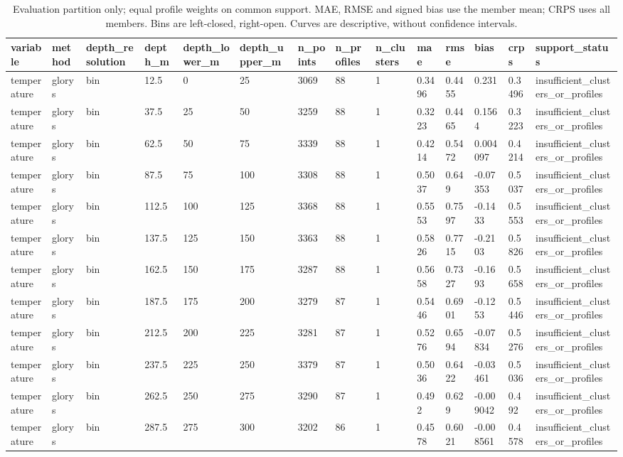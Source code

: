 \begin{table}[htbp]
\centering
\caption{Evaluation partition only; equal profile weights on common support. MAE, RMSE and signed bias use the member mean; CRPS uses all members. Bins are left-closed, right-open. Curves are descriptive, without confidence intervals.}
\begin{tabular}{llllllllllllll}
\toprule
variable & method & depth\_resolution & depth\_m & depth\_lower\_m & depth\_upper\_m & n\_points & n\_profiles & n\_clusters & mae & rmse & bias & crps & support\_status \\
\midrule
temperature & glorys & bin & 12.5 & 0 & 25 & 3069 & 88 & 1 & 0.3496 & 0.4455 & 0.231 & 0.3496 & insufficient\_clusters\_or\_profiles \\
temperature & glorys & bin & 37.5 & 25 & 50 & 3259 & 88 & 1 & 0.3223 & 0.4465 & 0.1564 & 0.3223 & insufficient\_clusters\_or\_profiles \\
temperature & glorys & bin & 62.5 & 50 & 75 & 3339 & 88 & 1 & 0.4214 & 0.5472 & 0.004097 & 0.4214 & insufficient\_clusters\_or\_profiles \\
temperature & glorys & bin & 87.5 & 75 & 100 & 3308 & 88 & 1 & 0.5037 & 0.649 & -0.07353 & 0.5037 & insufficient\_clusters\_or\_profiles \\
temperature & glorys & bin & 112.5 & 100 & 125 & 3368 & 88 & 1 & 0.5553 & 0.7597 & -0.1433 & 0.5553 & insufficient\_clusters\_or\_profiles \\
temperature & glorys & bin & 137.5 & 125 & 150 & 3363 & 88 & 1 & 0.5826 & 0.7715 & -0.2103 & 0.5826 & insufficient\_clusters\_or\_profiles \\
temperature & glorys & bin & 162.5 & 150 & 175 & 3287 & 88 & 1 & 0.5658 & 0.7327 & -0.1693 & 0.5658 & insufficient\_clusters\_or\_profiles \\
temperature & glorys & bin & 187.5 & 175 & 200 & 3279 & 87 & 1 & 0.5446 & 0.6901 & -0.1253 & 0.5446 & insufficient\_clusters\_or\_profiles \\
temperature & glorys & bin & 212.5 & 200 & 225 & 3281 & 87 & 1 & 0.5276 & 0.6594 & -0.07834 & 0.5276 & insufficient\_clusters\_or\_profiles \\
temperature & glorys & bin & 237.5 & 225 & 250 & 3379 & 87 & 1 & 0.5036 & 0.6422 & -0.03461 & 0.5036 & insufficient\_clusters\_or\_profiles \\
temperature & glorys & bin & 262.5 & 250 & 275 & 3290 & 87 & 1 & 0.492 & 0.629 & -0.009042 & 0.492 & insufficient\_clusters\_or\_profiles \\
temperature & glorys & bin & 287.5 & 275 & 300 & 3202 & 86 & 1 & 0.4578 & 0.6021 & -0.008561 & 0.4578 & insufficient\_clusters\_or\_profiles \\

\end{tabular}
\end{table}
